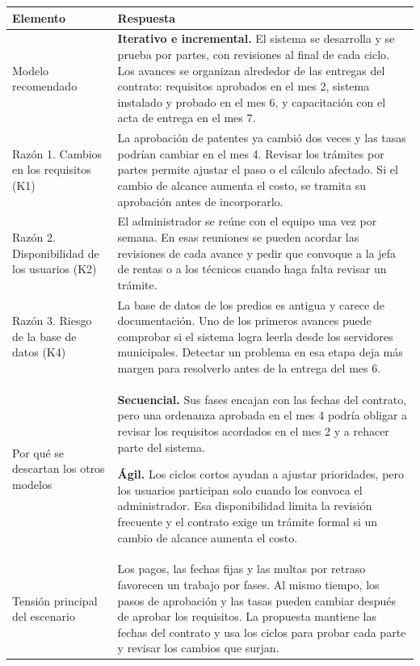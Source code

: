 \documentclass[11pt,a4paper]{article}
\begin{document}
	\begin{tabularx}{\textwidth}{|p{4.5cm}|Y|}
		\hline
		\textbf{Elemento} & \textbf{Respuesta} \\ \hline
		Modelo recomendado &
		\textbf{Iterativo e incremental.} El sistema se desarrolla y se prueba por
		partes, con revisiones al final de cada ciclo. Los avances se organizan
		alrededor de las entregas del contrato: requisitos aprobados en el mes 2,
		sistema instalado y probado en el mes 6, y capacitación con el acta de entrega
		en el mes 7. \\ \hline

		Razón 1. Cambios en los requisitos (K1) &
		La aprobación de patentes ya cambió dos veces y las tasas podrían cambiar en
		el mes 4. Revisar los trámites por partes permite ajustar el paso o el cálculo
		afectado. Si el cambio de alcance aumenta el costo, se tramita su aprobación
		antes de incorporarlo. \\ \hline

		Razón 2. Disponibilidad de los usuarios (K2) &
		El administrador se reúne con el equipo una vez por semana. En esas reuniones
		se pueden acordar las revisiones de cada avance y pedir que convoque a la jefa
		de rentas o a los técnicos cuando haga falta revisar un trámite. \\ \hline

		Razón 3. Riesgo de la base de datos (K4) &
		La base de datos de los predios es antigua y carece de documentación. Uno de
		los primeros avances puede comprobar si el sistema logra leerla desde los
		servidores municipales. Detectar un problema en esa etapa deja más margen para
		resolverlo antes de la entrega del mes 6. \\ \hline

		Por qué se descartan los otros modelos &
		\textbf{Secuencial.} Sus fases encajan con las fechas del contrato, pero una
		ordenanza aprobada en el mes 4 podría obligar a revisar los requisitos
		acordados en el mes 2 y a rehacer parte del sistema. \par \textbf{Ágil.} Los
		ciclos cortos ayudan a ajustar prioridades, pero los usuarios participan solo
		cuando los convoca el administrador. Esa disponibilidad limita la revisión
		frecuente y el contrato exige un trámite formal si un cambio de alcance
		aumenta el costo. \\ \hline

		Tensión principal del escenario &
		Los pagos, las fechas fijas y las multas por retraso favorecen un trabajo por
		fases. Al mismo tiempo, los pasos de aprobación y las tasas pueden cambiar
		después de aprobar los requisitos. La propuesta mantiene las fechas del
		contrato y usa los ciclos para probar cada parte y revisar los cambios que
		surjan. \\ \hline
	\end{tabularx}
	
\end{document}
